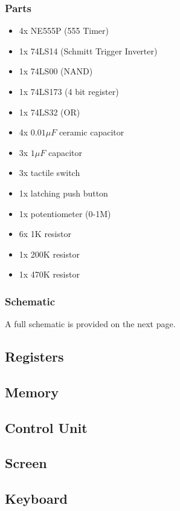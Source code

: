 \subsubsection*{Parts}
\begin{itemize}\itemsep0em
\item 4x NE555P (555 Timer)
\item 1x 74LS14 (Schmitt Trigger Inverter)
\item 1x 74LS00 (NAND)
\item 1x 74LS173 (4 bit register)
\item 1x 74LS32 (OR)
\item 4x $0.01\mu F$ ceramic capacitor
\item 3x $1\mu F$ capacitor
\item 3x tactile switch
\item 1x latching push button
\item 1x potentiometer (0-1M)
\item 6x 1K resistor
\item 1x 200K resistor
\item 1x 470K resistor
\end{itemize}

\subsubsection*{Schematic}
A full schematic is provided on the next page.


\subsection{Registers}
\subsection{Memory}
\subsection{Control Unit}
\subsection{Screen}
\subsection{Keyboard}
